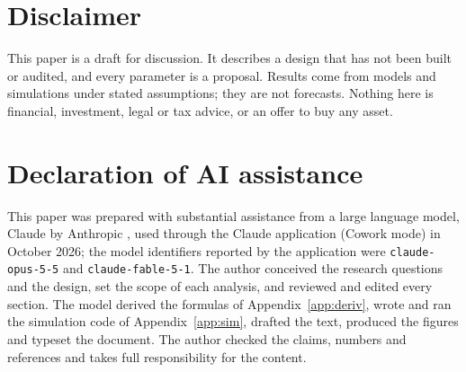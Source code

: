 \section*{Disclaimer}
This paper is a draft for discussion. It describes a design that has not been built or audited, and every parameter is a proposal. Results come from models and simulations under stated assumptions; they are not forecasts. Nothing here is financial, investment, legal or tax advice, or an offer to buy any asset.

\section*{Declaration of AI assistance}
This paper was prepared with substantial assistance from a large language model, Claude by Anthropic \cite{claude}, used through the Claude application (Cowork mode) in October 2026; the model identifiers reported by the application were \texttt{claude-opus-5-5} and \texttt{claude-fable-5-1}. The author conceived the research questions and the design, set the scope of each analysis, and reviewed and edited every section. The model derived the formulas of Appendix~\ref{app:deriv}, wrote and ran the simulation code of Appendix~\ref{app:sim}, drafted the text, produced the figures and typeset the document. The author checked the claims, numbers and references and takes full responsibility for the content.
